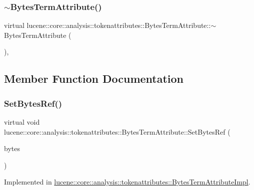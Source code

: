 \subsubsection{\texorpdfstring{$\sim$\+Bytes\+Term\+Attribute()}{~BytesTermAttribute()}}
{\footnotesize\ttfamily virtual lucene\+::core\+::analysis\+::tokenattributes\+::\+Bytes\+Term\+Attribute\+::$\sim$\+Bytes\+Term\+Attribute (\begin{DoxyParamCaption}{ }\end{DoxyParamCaption})\hspace{0.3cm}{\ttfamily [inline]}, {\ttfamily [virtual]}}



\subsection{Member Function Documentation}
\mbox{\label{classlucene_1_1core_1_1analysis_1_1tokenattributes_1_1BytesTermAttribute_ac0aafed04df791feabdc9771280110b9}} 
\subsubsection{\texorpdfstring{Set\+Bytes\+Ref()}{SetBytesRef()}}
{\footnotesize\ttfamily virtual void lucene\+::core\+::analysis\+::tokenattributes\+::\+Bytes\+Term\+Attribute\+::\+Set\+Bytes\+Ref (\begin{DoxyParamCaption}\item[{\mbox{\hyperlink{classlucene_1_1core_1_1util_1_1BytesRef}{lucene\+::core\+::util\+::\+Bytes\+Ref}} \&}]{bytes }\end{DoxyParamCaption})\hspace{0.3cm}{\ttfamily [pure virtual]}}



Implemented in \mbox{\hyperlink{classlucene_1_1core_1_1analysis_1_1tokenattributes_1_1BytesTermAttributeImpl_a132152487a88eae5feb1f88543d08c65}{lucene\+::core\+::analysis\+::tokenattributes\+::\+Bytes\+Term\+Attribute\+Impl}}.



